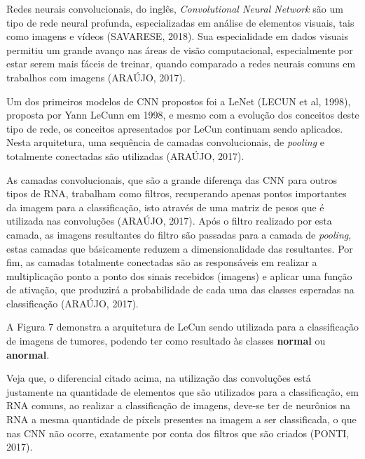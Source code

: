 Redes neurais convolucionais, do inglês, \textit{Convolutional Neural Network} são um tipo de rede neural profunda, especializadas em análise de elementos visuais, tais como imagens e vídeos (SAVARESE, 2018).  Sua especialidade em dados visuais permitiu um grande avanço nas áreas de visão computacional, especialmente por estar serem mais fáceis de treinar, quando comparado a redes neurais comuns em trabalhos com imagens (ARAÚJO, 2017).

Um dos primeiros modelos de CNN propostos foi a LeNet (LECUN et al, 1998), proposta por Yann LeCunn em 1998, e mesmo com a evolução dos conceitos deste tipo de rede, os conceitos apresentados por LeCun continuam sendo aplicados. Nesta arquitetura, uma sequência de camadas convolucionais, de \textit{pooling} e totalmente conectadas são utilizadas (ARAÚJO, 2017).

As camadas convolucionais, que são a grande diferença das CNN para outros tipos de RNA, trabalham como filtros, recuperando apenas pontos importantes da imagem para a classificação, isto através de uma matriz de pesos que é utilizada nas convoluções (ARAÚJO, 2017). Após o filtro realizado por esta camada, as imagens resultantes do filtro são passadas para a camada de \textit{pooling}, estas camadas que básicamente reduzem a dimensionalidade das resultantes. Por fim, as camadas totalmente conectadas são as responsáveis em realizar a multiplicação ponto a ponto dos sinais recebidos (imagens) e aplicar uma função de ativação, que produzirá a probabilidade de cada uma das classes esperadas na classificação (ARAÚJO, 2017).

A Figura 7 demonstra a arquitetura de LeCun sendo utilizada para a classificação de imagens de tumores, podendo ter como resultado às classes \textbf{normal} ou \textbf{anormal}.


Veja que, o diferencial citado acima, na utilização das convoluções está justamente na quantidade de elementos que são utilizados para a classificação, em RNA comuns, ao realizar a classificação de imagens, deve-se ter de neurônios na RNA a mesma quantidade de píxels presentes na imagem a ser classificada, o que nas CNN não ocorre, exatamente por conta dos filtros que são criados (PONTI, 2017). 

